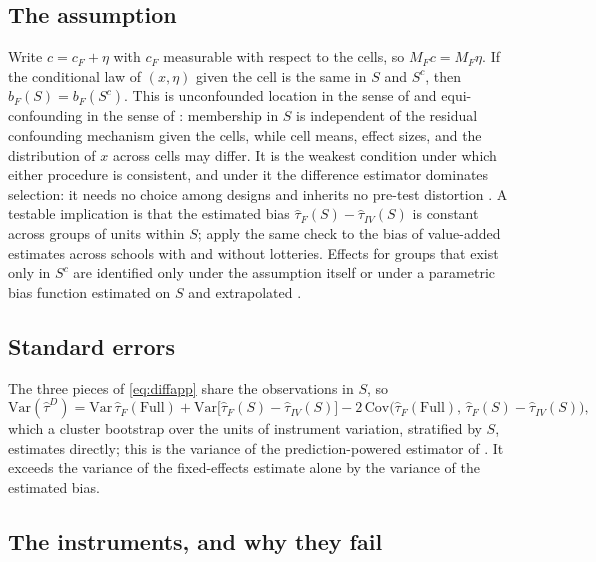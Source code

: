 \subsection{The assumption}
Write $c = c_F + \eta$ with $c_F$ measurable with respect to the cells, so $M_F c = M_F \eta$. If the conditional law of $(x, \eta)$ given the cell is the same in $S$ and $S^c$, then $b_F(S) = b_F(S^c)$. This is unconfounded location in the sense of \citet{hotz_predicting_2005} and equi-confounding in the sense of \citet{li_identification_2024}: membership in $S$ is independent of the residual confounding mechanism given the cells, while cell means, effect sizes, and the distribution of $x$ across cells may differ. It is the weakest condition under which either procedure is consistent, and under it the difference estimator dominates selection: it needs no choice among designs and inherits no pre-test distortion \citep{leeb_model_2005, guggenberger_impact_2010}. A testable implication is that the estimated bias $\hat\tau_F(S) - \hat\tau_{IV}(S)$ is constant across groups of units within $S$; \citet{angrist_leveraging_2017} apply the same check to the bias of value-added estimates across schools with and without lotteries. Effects for groups that exist only in $S^c$ are identified only under the assumption itself or under a parametric bias function estimated on $S$ and extrapolated \citep{kallus_removing_2018}.

\subsection{Standard errors}
The three pieces of \eqref{eq:diffapp} share the observations in $S$, so
\begin{equation}
\mathrm{Var}(\hat\tau^{D}) = \mathrm{Var}\,\hat\tau_F(\text{Full}) + \mathrm{Var}\big[\hat\tau_F(S) - \hat\tau_{IV}(S)\big] - 2\,\mathrm{Cov}\big(\hat\tau_F(\text{Full}),\, \hat\tau_F(S) - \hat\tau_{IV}(S)\big),
\end{equation}
which a cluster bootstrap over the units of instrument variation, stratified by $S$, estimates directly; this is the variance of the prediction-powered estimator of \citet{angelopoulos_prediction_2023}. It exceeds the variance of the fixed-effects estimate alone by the variance of the estimated bias.


\subsection{The instruments, and why they fail}\label{appendix:failedinstruments}

